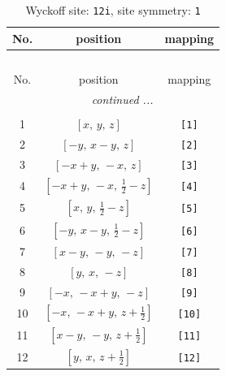 \documentclass[fleqn,8pt]{jsarticle}
\begin{document}
\renewcommand{\arraystretch}{1.2}
\begin{longtable}{ccc}
\caption{Wyckoff site: {\tt 12i}, site symmetry: {\tt 1}}
 \\
 \hline \hline
No. & position & mapping \\ \hline \endfirsthead

\multicolumn{2}{l}{\tablename\ \thetable{}} \\
 \hline \hline
No. & position & mapping \\ \hline \endhead

 \hline \hline
\multicolumn{2}{r}{\footnotesize\it continued ...} \\ \endfoot

 \hline \hline
\multicolumn{2}{r}{} \\ \endlastfoot

1 & $\left[ x,\, y,\, z \right]$ & {\tt [1]} \\ \hline
2 & $\left[ - y,\, x - y,\, z \right]$ & {\tt [2]} \\ \hline
3 & $\left[ - x + y,\, - x,\, z \right]$ & {\tt [3]} \\ \hline
4 & $\left[ - x + y,\, - x,\, \frac{1}{2} - z \right]$ & {\tt [4]} \\ \hline
5 & $\left[ x,\, y,\, \frac{1}{2} - z \right]$ & {\tt [5]} \\ \hline
6 & $\left[ - y,\, x - y,\, \frac{1}{2} - z \right]$ & {\tt [6]} \\ \hline
7 & $\left[ x - y,\, - y,\, - z \right]$ & {\tt [7]} \\ \hline
8 & $\left[ y,\, x,\, - z \right]$ & {\tt [8]} \\ \hline
9 & $\left[ - x,\, - x + y,\, - z \right]$ & {\tt [9]} \\ \hline
10 & $\left[ - x,\, - x + y,\, z + \frac{1}{2} \right]$ & {\tt [10]} \\ \hline
11 & $\left[ x - y,\, - y,\, z + \frac{1}{2} \right]$ & {\tt [11]} \\ \hline
12 & $\left[ y,\, x,\, z + \frac{1}{2} \right]$ & {\tt [12]} \\
\end{longtable}
\end{document}
